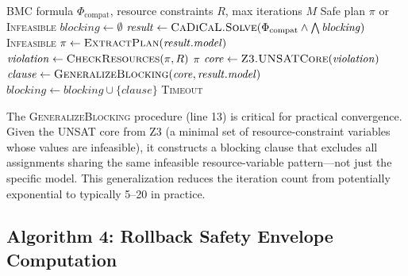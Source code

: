 \documentclass[10pt,twocolumn]{article}
\begin{document}
\begin{algorithm}[t]
\caption{\textsc{CEGARSolve}: CEGAR loop between CaDiCaL and Z3}
\label{alg:cegar}
\begin{algorithmic}[1]
\Require BMC formula $\Phi_{\mathrm{compat}}$, resource constraints $R$, max iterations $M$
\Ensure Safe plan $\pi$ or \textsc{Infeasible}
\State $\mathit{blocking} \gets \emptyset$
  \State $\mathit{result} \gets \textsc{CaDiCaL.Solve}(\Phi_{\mathrm{compat}} \wedge \bigwedge \mathit{blocking})$
    \State \Return \textsc{Infeasible}
  \EndIf
  \State $\pi \gets \textsc{ExtractPlan}(\mathit{result}.\mathit{model})$
  \State $\mathit{violation} \gets \textsc{CheckResources}(\pi, R)$ 
    \State \Return $\pi$ 
  \EndIf
  \State $\mathit{core} \gets \textsc{Z3.UNSATCore}(\mathit{violation})$
  \State $\mathit{clause} \gets \textsc{GeneralizeBlocking}(\mathit{core}, \mathit{result}.\mathit{model})$
  \State $\mathit{blocking} \gets \mathit{blocking} \cup \{\mathit{clause}\}$
\EndFor
\State \Return \textsc{Timeout}
\end{algorithmic}
\end{algorithm}

The \textsc{GeneralizeBlocking} procedure (line 13) is critical for practical convergence. Given the UNSAT core from Z3 (a minimal set of resource-constraint variables whose values are infeasible), it constructs a blocking clause that excludes all assignments sharing the same infeasible resource-variable pattern---not just the specific model. This generalization reduces the iteration count from potentially exponential to typically 5--20 in practice.

\subsection{Algorithm 4: Rollback Safety Envelope Computation}
\label{sec:alg-envelope}
\end{document}
